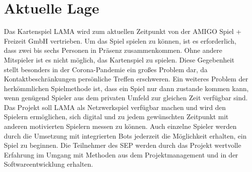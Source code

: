 \section{Aktuelle Lage}

Das Kartenspiel LAMA wird zum aktuellen Zeitpunkt von der AMIGO Spiel + Freizeit GmbH vertrieben. Um das Spiel spielen zu können, ist es erforderlich, dass zwei bis sechs Personen in Präsenz zusammenkommen. Ohne andere Mitspieler ist es nicht möglich, das Kartenspiel zu spielen. Diese Gegebenheit stellt besonders in der Corona-Pandemie ein großes Problem dar, da Kontaktbeschränkungen persönliche Treffen erschweren. Ein weiteres Problem der herkömmlichen Spielmethode ist, dass ein Spiel nur dann zustande kommen kann, wenn genügend Spieler aus dem privaten Umfeld zur gleichen Zeit verfügbar sind. Das Projekt soll LAMA als Netzwerkspiel verfügbar machen und wird den Spielern ermöglichen, sich digital und zu jedem gewünschten Zeitpunkt mit anderen motivierten Spielern messen zu können. Auch einzelne Spieler werden durch die Umsetzung mit integrierten Bots jederzeit die Möglichkeit erhalten, ein Spiel zu beginnen. Die Teilnehmer des SEP werden durch das Projekt wertvolle Erfahrung im Umgang mit Methoden aus dem Projektmanagement und in der Softwareentwicklung erhalten.